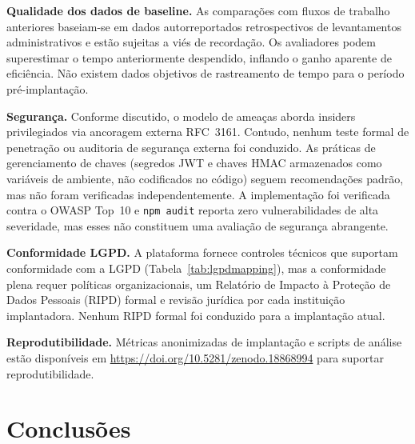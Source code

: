 \documentclass[preprint,12pt,a4paper]{elsarticle}
\begin{document}
\textbf{Qualidade dos dados de baseline.} As comparações com fluxos de trabalho anteriores baseiam-se em dados autorreportados retrospectivos de levantamentos administrativos e estão sujeitas a viés de recordação. Os avaliadores podem superestimar o tempo anteriormente despendido, inflando o ganho aparente de eficiência. Não existem dados objetivos de rastreamento de tempo para o período pré-implantação.

\textbf{Segurança.} Conforme discutido, o modelo de ameaças aborda insiders privilegiados via ancoragem externa RFC~3161. Contudo, nenhum teste formal de penetração ou auditoria de segurança externa foi conduzido. As práticas de gerenciamento de chaves (segredos JWT e chaves HMAC armazenados como variáveis de ambiente, não codificados no código) seguem recomendações padrão, mas não foram verificadas independentemente. A implementação foi verificada contra o OWASP Top~10 \citep{Owasp2023} e \texttt{npm audit} reporta zero vulnerabilidades de alta severidade, mas esses não constituem uma avaliação de segurança abrangente.

\textbf{Conformidade LGPD.} A plataforma fornece controles técnicos que suportam conformidade com a LGPD (Tabela~\ref{tab:lgpdmapping}), mas a conformidade plena requer políticas organizacionais, um Relatório de Impacto à Proteção de Dados Pessoais (RIPD) formal e revisão jurídica por cada instituição implantadora. Nenhum RIPD formal foi conduzido para a implantação atual.

\textbf{Reprodutibilidade.} Métricas anonimizadas de implantação e scripts de análise estão disponíveis em \url{https://doi.org/10.5281/zenodo.18868994} para suportar reprodutibilidade.

\section{Conclusões}
\end{document}
